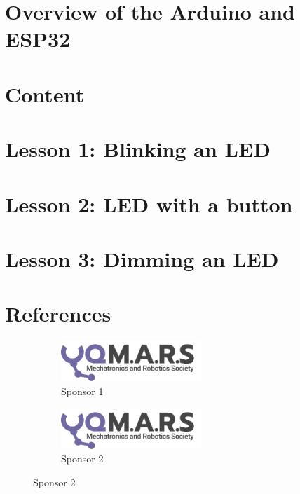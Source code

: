 \documentclass[a4paper,12pt]{report}
\begin{document}
\section*{Overview of the Arduino and ESP32}

\newpage
\section*{Content}

\newpage
\section*{Lesson 1: Blinking an LED}

\newpage
\section*{Lesson 2: LED with a button}

\newpage
\section*{Lesson 3: Dimming an LED}

\newpage
\section*{References}



\begin{figure}[!htb]
    \captionsetup[subfigure]{labelformat=empty}
     \centering
        \begin{subfigure}[b]{0.3\textwidth}
        \centering
        \includegraphics[width=200]{Assets/Logo (Dark).png}
        \caption{Sponsor 1}
        \end{subfigure}
     \hfill
        \begin{subfigure}[b]{0.5\textwidth}
        \centering
        \includegraphics[width=200]{Assets/Logo (Dark).png}
        \caption{Sponsor 2}
        \end{subfigure}
\end{figure}
\end{document}
